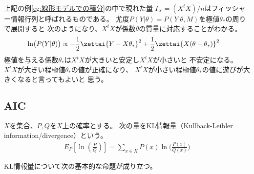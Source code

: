 		\begin{note}[フィッシャー情報行列]\label{note:フィッシャー情報行列} %
			上記の例\ref{eg:線形モデルでの積分}の中で現れた量
			$I_X=(X^tX)/n$はフィッシャー情報行列と呼ばれるものである。
			尤度$P(Y|\theta)=P(Y|\theta,M)$を極値$\theta_*$の周りで展開すると
			次のようになり、$X^tX$が係数$\theta$の質量に対応することがわかる。
			\begin{equation*}\begin{split} %
				\ln\bigl(P(Y|\theta)\bigr)
				&\propto -\frac{1}{2}\zettai{Y-X\theta_*}^2 
					+ \frac{1}{2}\zettai{X(\theta-\theta_*)}^2
			\end{split}\end{equation*} %
			極値を与える係数$\theta_*$は$X^tX$が大きいと安定し$X^tX$が小さいと
			不安定になる。$X^tX$が大きい程極値$\theta_*$の値が正確になり、
			$X^tX$が小さい程極値$\theta_*$の値に遊びが大きくなると言ってもよいと
			思う。
		\end{note} %
	\subsection{AIC}\label{s2:AIC} %
		\begin{definition}[KL情報量]\label{def:KL情報量} %
			$X$を集合、$P,Q$を$X$上の確率とする。
			次の量をKL情報量（Kullback-Leibler information/divergence）という。
			\begin{equation*}\begin{split} %
				E_P[\ln(\frac{P}{Q})] 
				= \sum_{x\in X}P(x)\ln\bigl(\frac{P(x)}{Q(x)}\bigr)
			\end{split}\end{equation*} %
		\end{definition} %

		KL情報量について次の基本的な命題が成り立つ。

